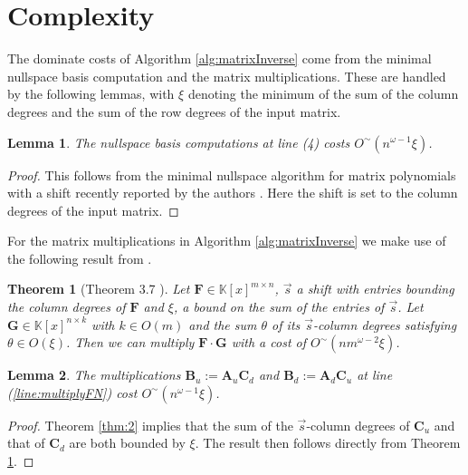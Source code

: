 \documentclass[a4paper,11pt]{article}
\newtheorem{thm}{Theorem}
\newtheorem{lem}{Lemma}
\begin{document}
\section{Complexity}\label{sec:complexity}

The dominate costs of Algorithm \ref{alg:matrixInverse} come from the minimal nullspace basis computation and the matrix multiplications. These are handled by the following lemmas, with 
$\xi$ denoting the minimum of the sum of the column degrees and the sum of the row degrees of the input matrix.
\begin{lem}
The nullspace basis computations at line (4) %
costs $O^{\sim}(n^{\omega-1}\xi)$.
\end{lem}
\begin{proof}
This follows from the minimal nullspace algorithm for matrix polynomials with a shift recently reported by the authors 
\cite{zhou-labahn-storjohann:12}. Here the shift is set to
the column degrees of the input matrix.
\end{proof}

For the matrix multiplications in Algorithm \ref{alg:matrixInverse} we make use of the following result from \cite[page 369]{zhou-labahn-storjohann:12}.

\begin{thm}[Theorem 3.7 \cite{zhou-labahn-storjohann:12}]
\label{thm:multiplyUnbalancedMatrices} 
Let $\mathbf{F}\in\mathbb{K}\left[x\right]^{m\times n}$, $\vec{s}$ a shift with entries bounding 
the column degrees of $\mathbf{F}$ and $\xi$, a bound on the sum of the entries of $\vec{s}$. Let $\mathbf{G}\in\mathbb{K}\left[x\right]^{n\times k}$ with $k\in O\left(m\right)$ and the sum 
$\theta$ of its $\vec{s}$-column degrees satisfying $\theta\in O\left(\xi\right)$. Then we can multiply $\mathbf{F} \cdot \mathbf{G}$ with a cost of $O^{\sim}(nm^{\omega-2}\xi)$.
\end{thm}

\begin{lem}
The multiplications $\mathbf{B}_{u}:=\mathbf{A}_{u}\mathbf{C}_{d}$
and $\mathbf{B}_{d}:=\mathbf{A}_{d}\mathbf{C}_{u}$ at line (\ref{line:multiplyFN})
cost $O^{\sim}(n^{\omega-1}\xi)$.
\end{lem}
\begin{proof}
Theorem \ref{thm:2} implies that the sum of the 
$\vec{s}$-column degrees of $\mathbf{C}_{u}$ and that of $\mathbf{C}_{d}$ are both bounded 
by $\xi$. The result then follows directly from Theorem \ref{thm:multiplyUnbalancedMatrices}.
\end{proof}
\end{document}
